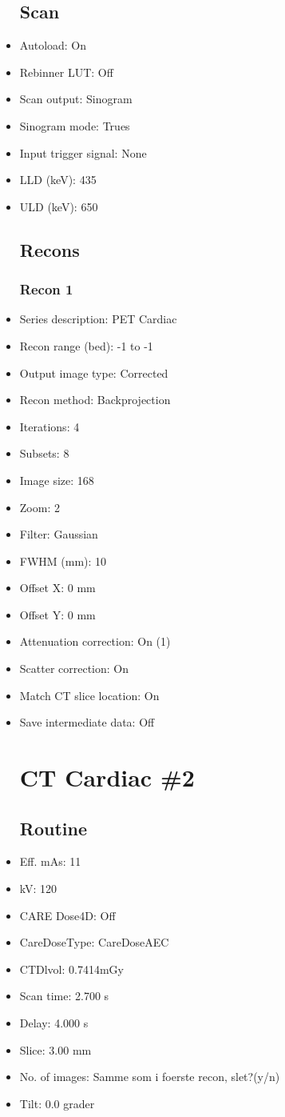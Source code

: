 \documentclass[12pt]{article}
\begin{document}
\begin{itemize}[noitemsep]
\subsection{Scan}
\item Autoload: On
\item Rebinner LUT: Off
\item Scan output: Sinogram
\item Sinogram mode: Trues
\item Input trigger signal: None
\item LLD (keV): 435
\item ULD (keV): 650
\subsection{Recons}
\subsubsection{Recon 1}
\item Series description: PET Cardiac
\item Recon range (bed): -1 to -1
\item Output image type: Corrected
\item Recon method: Backprojection
\item Iterations: 4
\item Subsets: 8
\item Image size: 168
\item Zoom: 2
\item Filter: Gaussian
\item FWHM (mm): 10
\item Offset X: 0 mm
\item Offset Y: 0 mm
\item Attenuation correction: On (1)
\item Scatter correction: On
\item Match CT slice location: On
\item Save intermediate data: Off
\section{CT Cardiac \#2}
\subsection{Routine}
\item Eff. mAs: 11\item kV: 120\item CARE Dose4D: Off\item CareDoseType: CareDoseAEC\item CTDlvol: 0.7414mGy\item Scan time: 2.700 s\item Delay: 4.000 s\item Slice: 3.00 mm\item No. of images: Samme som i foerste recon, slet?(y/n)\item Tilt: 0.0 grader

\end{itemize}
\end{document}

